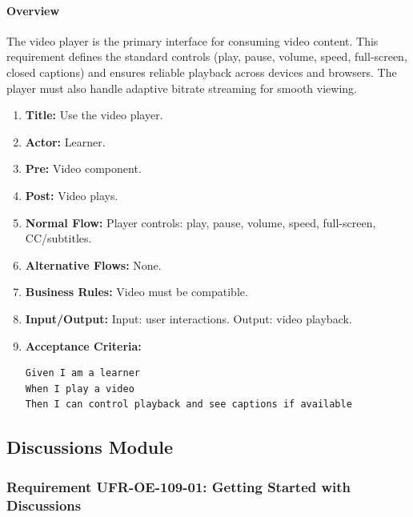 \paragraph{Overview}
The video player is the primary interface for consuming video content. This requirement defines the standard controls (play, pause, volume, speed, full‑screen, closed captions) and ensures reliable playback across devices and browsers. The player must also handle adaptive bitrate streaming for smooth viewing.
\begin{enumerate}[label=\textbf{\arabic*.}]
\item \textbf{Title:} Use the video player.
\item \textbf{Actor:} Learner.
\item \textbf{Pre:} Video component.
\item \textbf{Post:} Video plays.
\item \textbf{Normal Flow:} Player controls: play, pause, volume, speed, full-screen, CC/subtitles.
\item \textbf{Alternative Flows:} None.
\item \textbf{Business Rules:} Video must be compatible.
\item \textbf{Input/Output:} Input: user interactions. Output: video playback.
\item \textbf{Acceptance Criteria:}
    \begin{verbatim}
Given I am a learner
When I play a video
Then I can control playback and see captions if available
    \end{verbatim}
\end{enumerate}

\subsection{Discussions Module}
\subsubsection{Requirement UFR-OE-109-01: Getting Started with Discussions}
